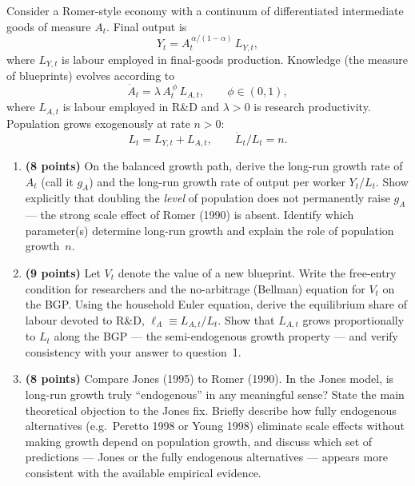 \documentclass[a4paper,11pt]{article}
\begin{document}
Consider a Romer-style economy with a continuum of differentiated intermediate goods of
measure $A_t$.  Final output is
\[
    Y_t = A_t^{\,\alpha/(1-\alpha)}\,L_{Y,t},
\]
where $L_{Y,t}$ is labour employed in final-goods production.  Knowledge (the measure of
blueprints) evolves according to
\[
    \dot{A}_t = \lambda\,A_t^{\,\phi}\,L_{A,t}, \qquad \phi \in (0,1),
\]
where $L_{A,t}$ is labour employed in R\&D and $\lambda > 0$ is research productivity.
Population grows exogenously at rate $n > 0$:
\[
    L_t = L_{Y,t} + L_{A,t}, \qquad \dot{L}_t/L_t = n.
\]

\begin{enumerate}[label=\textbf{\arabic*.}, leftmargin=*, itemsep=8pt]

    \item \textbf{(8 points)} On the balanced growth path, derive the long-run growth rate
    of $A_t$ (call it $g_A$) and the long-run growth rate of output per worker $Y_t/L_t$.
    Show explicitly that doubling the \emph{level} of population does not permanently raise
    $g_A$ --- the strong scale effect of Romer (1990) is absent.  Identify which
    parameter(s) determine long-run growth and explain the role of population growth~$n$.

    \item \textbf{(9 points)} Let $V_t$ denote the value of a new blueprint.  Write the
    free-entry condition for researchers and the no-arbitrage (Bellman) equation for $V_t$
    on the BGP.  Using the household Euler equation, derive the equilibrium share of labour
    devoted to R\&D, $\ell_A \equiv L_{A,t}/L_t$.  Show that $L_{A,t}$ grows
    proportionally to $L_t$ along the BGP --- the semi-endogenous growth property --- and
    verify consistency with your answer to question~1.

    \item \textbf{(8 points)} Compare Jones (1995) to Romer (1990).  In the Jones model, is
    long-run growth truly ``endogenous'' in any meaningful sense?  State the main
    theoretical objection to the Jones fix.  Briefly describe how fully endogenous
    alternatives (e.g.\ Peretto 1998 or Young 1998) eliminate scale effects without making
    growth depend on population growth, and discuss which set of predictions --- Jones or the
    fully endogenous alternatives --- appears more consistent with the available empirical
    evidence.

\end{enumerate}

\clearpage
\end{document}
